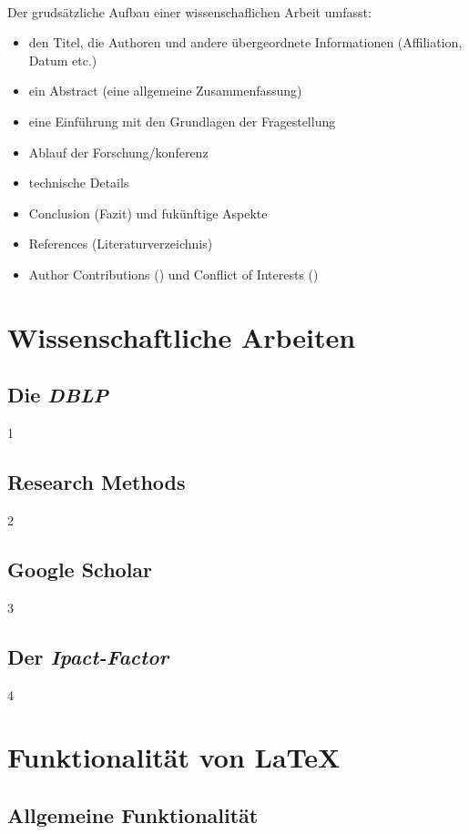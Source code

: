 \documentclass[12pt, a4paper]{article}
\begin{document}
\paragraph{}
Der grudsätzliche Aufbau einer wissenschaflichen Arbeit umfasst:
\begin{itemize}
\item den Titel, die Authoren und andere übergeordnete Informationen (Affiliation, Datum etc.)
\item ein Abstract (eine allgemeine Zusammenfassung)
\item eine Einführung mit den Grundlagen der Fragestellung
\item Ablauf der Forschung/konferenz
\item technische Details
\item Conclusion (Fazit) und fukünftige Aspekte
\item References (Literaturverzeichnis)
\item Author Contributions () und Conflict of Interests ()
\end{itemize}


\section{Wissenschaftliche Arbeiten}
\subsection{Die \textit{DBLP}}
1
\subsection{Research Methods}
2
\subsection{Google Scholar}
3
\subsection{Der \textit{Ipact-Factor}}
4
\section{Funktionalität von \LaTeX}
\subsection{Allgemeine Funktionalität}
\end{document}
